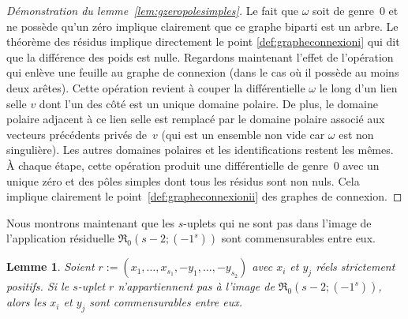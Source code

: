 \documentclass[11pt]{article}
\numberwithin{equation}{section}\renewcommand{\proofname}{Démonstration}
\newcommand{\appres}[1][g]{\mathfrak{R}_{#1}}
\newtheorem{lem}[thm]{Lemme}
\theoremstyle{definition}
\begin{document}
\begin{proof}[Démonstration du lemme~\ref{lem:gzeropolesimples}]
Le fait que $\omega$ soit de genre~$0$ et ne possède qu'un zéro implique clairement que ce graphe biparti est un arbre. Le théorème des résidus implique directement le point \eqref{def:grapheconnexioni} qui dit que la différence des poids est nulle. Regardons maintenant l'effet de l'opération qui enlève une feuille au graphe de connexion (dans le cas où il possède au moins deux arêtes). Cette opération revient à couper la différentielle $\omega$ le long d'un lien selle $v$ dont l'un des côté est un unique domaine polaire. De plus, le domaine polaire adjacent à ce lien selle est remplacé par le domaine polaire associé aux vecteurs précédents privés de~$v$ (qui est un ensemble non vide car $\omega$ est non singulière). Les autres domaines polaires et les identifications restent les mêmes.
À chaque étape, cette opération produit une différentielle de genre~$0$ avec un unique zéro et des pôles simples dont tous les résidus sont non nuls. Cela implique clairement le point~\eqref{def:grapheconnexionii} des graphes de connexion.
\end{proof}

Nous montrons maintenant que les $s$-uplets qui ne sont pas dans l'image de l'application résiduelle $\appres[0](s-2;(-1^{s}))$ sont commensurables entre eux.
\begin{lem}\label{lem:finietcommens}
Soient $r:=(x_{1},\dots,x_{s_{1}},-y_{1},\dots,-y_{s_{2}})$ avec $x_{i}$ et $y_{j}$ réels strictement positifs. Si le $s$-uplet $r$ n'appartiennent pas à l'image de $\appres[0](s-2;(-1^{s}))$, alors les $x_{i}$ et $y_{j}$ sont commensurables entre eux.
\end{lem}
\end{document}
